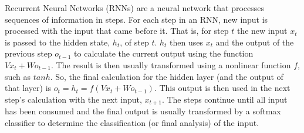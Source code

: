 Recurrent Neural Networks (RNNs) are a neural network that processes sequences of information in steps. For each step in an RNN, new input is processed with the input that came before it. That is, for step $t$ the new input $x_t$ is passed to the hidden state, $h_t$, of step $t$. $h_t$ then uses $x_t$ and the output of the previous step $o_{t-1}$ to calculate the current output using the function $Vx_t + Wo_{t-1}$. The result is then usually transformed using a nonlinear function $f$, such as $tanh$. So, the final calculation for the hidden layer (and the output of that layer) is $o_t = h_t = f(Vx_t + Wo_{t-1})$. This output is then used in the next step's calculation with the next input, $x_{t+1}$. The steps continue until all input has been consumed and the final output is usually transformed by a softmax classifier to determine the classification (or final analysis) of the input.
